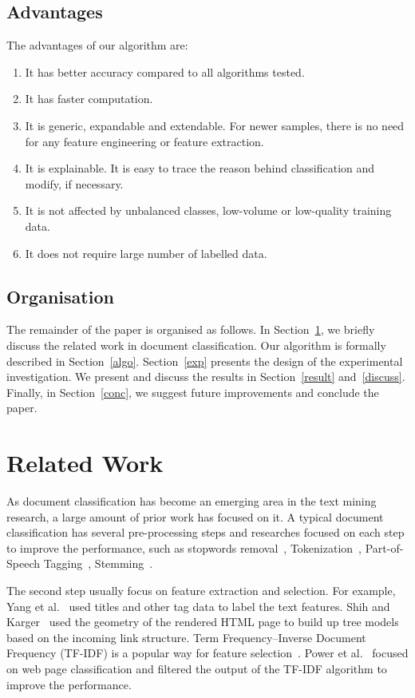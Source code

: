 \subsection{Advantages}
The advantages of our algorithm are:
\begin{enumerate}
\item It has better accuracy compared to all algorithms tested.
\item It has faster computation.
\item It is generic, expandable and extendable. For newer samples, there is no need for any feature engineering or feature extraction.
\item It is explainable. It is easy to trace the reason behind classification and modify, if necessary. 
\item It is not affected by unbalanced classes, low-volume or low-quality training data.
\item It does not require large number of labelled data.
\end{enumerate}

\subsection{Organisation}
The remainder of the paper is organised as follows. In Section~\ref{work}, we briefly discuss the related work in document classification. Our algorithm is formally described in Section~\ref{algo}. Section~\ref{exp} presents the design of the experimental investigation. We present and discuss the results in Section~\ref{result} and~\ref{discuss}. Finally, in Section~\ref{conc}, we suggest future improvements and conclude the paper.

\section{Related Work}\label{work}
As document classification has become an emerging area in the text mining research, a large amount of prior work has focused on it. A typical document classification has several pre-processing steps and researches focused on each step to improve the performance, such as stopwords removal~\cite{manalu2017,prathibha2015}, Tokenization~\cite{bakar2014,gadri2015}, Part-of-Speech Tagging~\cite{owoputi2012}, Stemming~\cite{zhang2007}.

The second step usually focus on feature extraction and selection. For example, Yang et al.~\cite{yang2002} used titles and other tag data to label the text features. Shih and Karger~\cite{shih2004} used the geometry of the rendered HTML page to build up tree models based on the incoming link structure. Term Frequency–Inverse Document Frequency (TF-IDF) is a popular way for feature selection~\cite{jones1972}. Power et al.~\cite{power2010} focused on web page classification and filtered the output of the TF-IDF algorithm to improve the performance.

